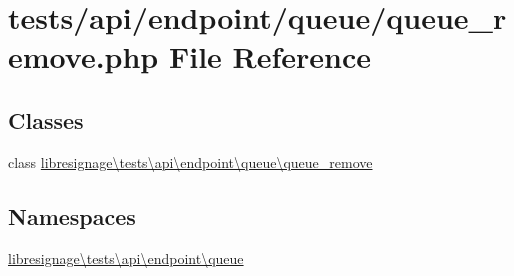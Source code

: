 \hypertarget{tests_2api_2endpoint_2queue_2queue__remove_8php}{}\section{tests/api/endpoint/queue/queue\+\_\+remove.php File Reference}
\label{tests_2api_2endpoint_2queue_2queue__remove_8php}
\subsection*{Classes}
\begin{DoxyCompactItemize}
\item 
class \hyperlink{classlibresignage_1_1tests_1_1api_1_1endpoint_1_1queue_1_1queue__remove}{libresignage\textbackslash{}tests\textbackslash{}api\textbackslash{}endpoint\textbackslash{}queue\textbackslash{}queue\+\_\+remove}
\end{DoxyCompactItemize}
\subsection*{Namespaces}
\begin{DoxyCompactItemize}
\item 
 \hyperlink{namespacelibresignage_1_1tests_1_1api_1_1endpoint_1_1queue}{libresignage\textbackslash{}tests\textbackslash{}api\textbackslash{}endpoint\textbackslash{}queue}
\end{DoxyCompactItemize}
